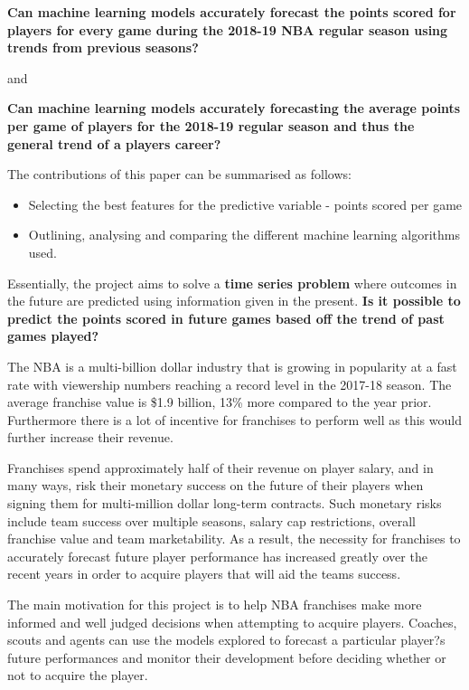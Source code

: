 \documentclass[a4paper,11pt,twoside]{article}
\begin{document}
\begin{center}
\textbf{Can machine learning models accurately forecast the points scored for players for every game during the 2018-19 NBA regular season using trends from previous seasons?}

and 

\textbf{Can machine learning models accurately forecasting the average points per game of players for the 2018-19 regular season and thus the general trend of a players career?}
\end{center}
\vspace{7mm}

The contributions of this paper can be summarised as follows:
\begin{itemize}
    \item Selecting the best features for the predictive variable - points scored per game
    \item Outlining, analysing and comparing the different machine learning algorithms used.
\end{itemize}
Essentially, the project aims to solve a \textbf{time series problem} where outcomes in the future are predicted using information given in the present. \textbf{Is it possible to predict the points scored in future games based off the trend of past games played?}

The NBA is a multi-billion dollar industry that is growing in popularity at a fast rate with viewership numbers reaching a record level in the 2017-18 season. The average franchise value is \$1.9 billion, 13\% more compared to the year prior. Furthermore there is a lot of incentive for franchises to perform well as this would further increase their revenue.

Franchises spend approximately half of their revenue on player salary, and in many ways, risk their monetary success on the future of their players when signing them for multi-million dollar long-term contracts. Such monetary risks include team success over multiple seasons, salary cap restrictions, overall franchise value and team marketability. As a result, the necessity for franchises to accurately forecast future player performance has increased greatly over the recent years in order to acquire players that will aid the teams success.

The main motivation for this project is to help NBA franchises make more informed and well judged decisions when attempting to acquire players. Coaches, scouts and agents can use the models explored  to forecast a particular player?s future performances and monitor their development before deciding whether or not to acquire the player. 
\end{document}
